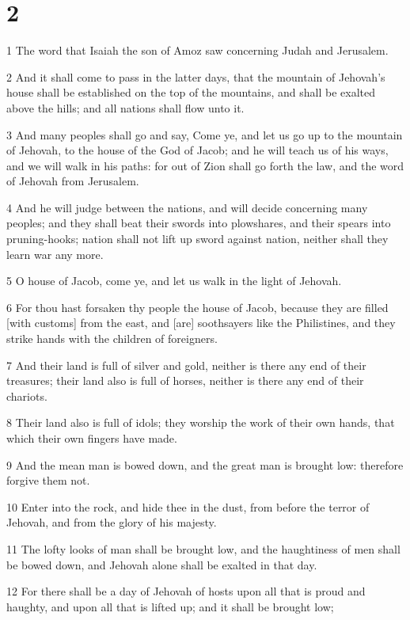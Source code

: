 \chapter{2}

\par 1 The word that Isaiah the son of Amoz saw concerning Judah and Jerusalem.
\par 2 And it shall come to pass in the latter days, that the mountain of Jehovah's house shall be established on the top of the mountains, and shall be exalted above the hills; and all nations shall flow unto it.
\par 3 And many peoples shall go and say, Come ye, and let us go up to the mountain of Jehovah, to the house of the God of Jacob; and he will teach us of his ways, and we will walk in his paths: for out of Zion shall go forth the law, and the word of Jehovah from Jerusalem.
\par 4 And he will judge between the nations, and will decide concerning many peoples; and they shall beat their swords into plowshares, and their spears into pruning-hooks; nation shall not lift up sword against nation, neither shall they learn war any more.
\par 5 O house of Jacob, come ye, and let us walk in the light of Jehovah.
\par 6 For thou hast forsaken thy people the house of Jacob, because they are filled [with customs] from the east, and [are] soothsayers like the Philistines, and they strike hands with the children of foreigners.
\par 7 And their land is full of silver and gold, neither is there any end of their treasures; their land also is full of horses, neither is there any end of their chariots.
\par 8 Their land also is full of idols; they worship the work of their own hands, that which their own fingers have made.
\par 9 And the mean man is bowed down, and the great man is brought low: therefore forgive them not.
\par 10 Enter into the rock, and hide thee in the dust, from before the terror of Jehovah, and from the glory of his majesty.
\par 11 The lofty looks of man shall be brought low, and the haughtiness of men shall be bowed down, and Jehovah alone shall be exalted in that day.
\par 12 For there shall be a day of Jehovah of hosts upon all that is proud and haughty, and upon all that is lifted up; and it shall be brought low;
